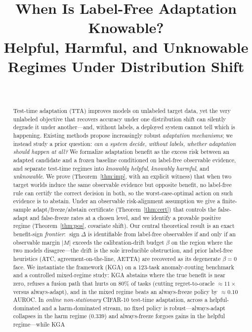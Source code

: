 \documentclass[conference]{IEEEtran}
\title{When Is Label-Free Adaptation Knowable? \\
Helpful, Harmful, and Unknowable Regimes Under Distribution Shift}
\author{\IEEEauthorblockN{Anonymous Author}\\
\IEEEauthorblockA{Independent Researcher}}
\theoremstyle{plain}
\theoremstyle{definition}
\newcommand{\sign}{\operatorname{sign}}
\begin{document}
\maketitle

\begin{abstract}
Test-time adaptation (TTA) improves models on unlabeled target data, yet the very
unlabeled objective that recovers accuracy under one distribution shift can silently
degrade it under another---and, without labels, a deployed system cannot tell which is
happening. Existing methods propose increasingly robust
\emph{adaptation mechanisms}; we instead study a prior question: \emph{can a system
decide, without labels, whether adaptation should happen at all?} We formalize
adaptation benefit as the excess risk between an adapted candidate and a frozen
baseline conditioned on label-free observable evidence, and separate test-time
regimes into \emph{knowably helpful}, \emph{knowably harmful}, and \emph{unknowable}.
We prove (Theorem~\ref{thm:imp}, with an explicit witness) that when two target worlds
induce the same observable evidence but opposite benefit, no label-free rule can
certify the correct decision in both, so the worst-case-optimal action on such
evidence is to abstain. Under an observable risk-alignment assumption we give a
finite-sample adapt/freeze/abstain certificate (Theorem~\ref{thm:cert}) that controls
the false-adapt and false-freeze rates at a chosen level, and we identify a provable
positive regime (Theorem~\ref{thm:pos}, covariate shift). Our central theoretical result
is an exact benefit-sign \emph{frontier}: $\sign\Delta$ is identifiable from label-free
observables if and only if an observable margin $|M|$ exceeds the calibration-drift
budget $\beta$ on the region where the two models disagree---the drift is the sole
irreducible obstruction, and prior label-free heuristics (ATC, agreement-on-the-line,
AETTA) are recovered as its degenerate $\beta{=}0$ face. We instantiate the framework
(\textsc{KGA}) on a 123-task anomaly-routing benchmark and a controlled mixed-regime
study: \textsc{KGA} abstains where the true benefit is near zero, refuses a fusion
path that hurts on 80\% of tasks (cutting regret-to-oracle $\approx 11\times$ versus
always-adapt), and in the mixed regime beats an always-freeze policy by $\approx 0.10$
AUROC. In \emph{online non-stationary} CIFAR-10 test-time adaptation, across a helpful-dominated
and a harm-dominated stream, no fixed policy is robust---always-adapt collapses in the harm
regime ($0.339$) and always-freeze forgoes gains in the helpful regime---while \textsc{KGA}

\end{abstract}
\end{document}
